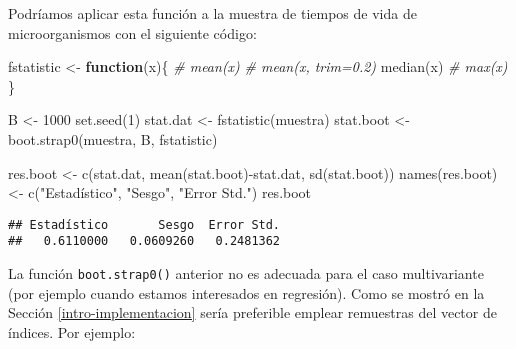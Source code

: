 \documentclass[
]{book}
\newenvironment{Shaded}{\begin{snugshade}}{\end{snugshade}}
\newcommand{\CommentTok}[1]{\textcolor[rgb]{0.56,0.35,0.01}{\textit{#1}}}
\newcommand{\ControlFlowTok}[1]{\textcolor[rgb]{0.13,0.29,0.53}{\textbf{#1}}}
\newcommand{\DecValTok}[1]{\textcolor[rgb]{0.00,0.00,0.81}{#1}}
\newcommand{\FunctionTok}[1]{\textcolor[rgb]{0.00,0.00,0.00}{#1}}
\newcommand{\NormalTok}[1]{#1}
\newcommand{\OtherTok}[1]{\textcolor[rgb]{0.56,0.35,0.01}{#1}}
\newcommand{\SpecialCharTok}[1]{\textcolor[rgb]{0.00,0.00,0.00}{#1}}
\newcommand{\StringTok}[1]{\textcolor[rgb]{0.31,0.60,0.02}{#1}}
\theoremstyle{break}
\theoremstyle{definition}
\theoremstyle{definition}
\theoremstyle{definition}
\theoremstyle{definition}
\theoremstyle{remark}
\begin{document}
Podríamos aplicar esta función a la muestra de tiempos de vida de
microorganismos con el siguiente código:

\begin{Shaded}
\begin{Highlighting}[]
\NormalTok{fstatistic }\OtherTok{\textless{}{-}} \ControlFlowTok{function}\NormalTok{(x)\{}
  \CommentTok{\#  mean(x)}
  \CommentTok{\#  mean(x, trim=0.2)}
  \FunctionTok{median}\NormalTok{(x)}
  \CommentTok{\#  max(x)}
\NormalTok{\}}

\NormalTok{B }\OtherTok{\textless{}{-}} \DecValTok{1000}
\FunctionTok{set.seed}\NormalTok{(}\DecValTok{1}\NormalTok{)}
\NormalTok{stat.dat }\OtherTok{\textless{}{-}} \FunctionTok{fstatistic}\NormalTok{(muestra)}
\NormalTok{stat.boot }\OtherTok{\textless{}{-}} \FunctionTok{boot.strap0}\NormalTok{(muestra, B, fstatistic)}

\NormalTok{res.boot }\OtherTok{\textless{}{-}} \FunctionTok{c}\NormalTok{(stat.dat, }\FunctionTok{mean}\NormalTok{(stat.boot)}\SpecialCharTok{{-}}\NormalTok{stat.dat, }\FunctionTok{sd}\NormalTok{(stat.boot))}
\FunctionTok{names}\NormalTok{(res.boot) }\OtherTok{\textless{}{-}} \FunctionTok{c}\NormalTok{(}\StringTok{"Estadístico"}\NormalTok{, }\StringTok{"Sesgo"}\NormalTok{, }\StringTok{"Error Std."}\NormalTok{)}
\NormalTok{res.boot}
\end{Highlighting}
\end{Shaded}

\begin{verbatim}
## Estadístico       Sesgo  Error Std. 
##   0.6110000   0.0609260   0.2481362
\end{verbatim}

La función \texttt{boot.strap0()} anterior no es adecuada para el caso multivariante
(por ejemplo cuando estamos interesados en regresión).
Como se mostró en la Sección \ref{intro-implementacion}
sería preferible emplear remuestras del vector de índices. Por ejemplo:
\end{document}
